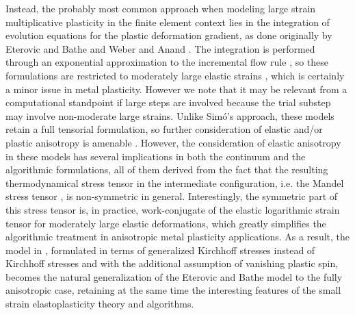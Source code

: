 \documentclass[preprint,review,12pt,sort&compress]{elsarticle}%
\begin{document}
Instead, the probably most common approach when modeling large strain
multiplicative plasticity in the finite element context lies in the
integration of evolution equations for the plastic deformation gradient, as
done originally by Eterovic and Bathe \cite{EterovicBathe90} and Weber and
Anand \cite{WeberAnand90}. The integration is performed through an exponential
approximation to the incremental flow rule \cite{Simo98}, so these
formulations are restricted to moderately large elastic strains
\cite{EterovicBathe90,CamineroMontansBathe11}, which is certainly a minor
issue in metal plasticity. However we note that it may be relevant from a
computational standpoint if large steps are involved because the trial substep
may involve non-moderate large strains. Unlike Sim\'{o}'s approach, these
models retain a full tensorial formulation, so further consideration of
elastic and/or plastic anisotropy is amenable
\cite{ChattiEtAl01,HanEtAL03,EidelGruttman03,MenzelEtAl05,SansourKarsajSoric06,MontansBathe07,KimMontansBathe09,VladimirovPietrygaReese10,CamineroMontansBathe11}%
. However, the consideration of elastic anisotropy in these models has several
implications in both the continuum and the algorithmic formulations, all of
them derived from the fact that the resulting thermodynamical stress tensor in
the intermediate configuration, i.e. the Mandel stress tensor \cite{Mandel72},
is non-symmetric in general. Interestingly, the symmetric part of this stress
tensor is, in practice, work-conjugate of the elastic logarithmic strain
tensor for moderately large elastic deformations, which greatly simplifies the
algorithmic treatment \cite{CamineroMontansBathe11} in anisotropic metal
plasticity applications. As a result, the model in
\cite{CamineroMontansBathe11}, formulated in terms of generalized Kirchhoff
stresses instead of Kirchhoff stresses and with the additional assumption of
vanishing plastic spin, becomes the natural generalization of the Eterovic and
Bathe model \cite{EterovicBathe90} to the fully anisotropic case, retaining at
the same time the interesting features of the small strain elastoplasticity
theory and algorithms.
\end{document}

